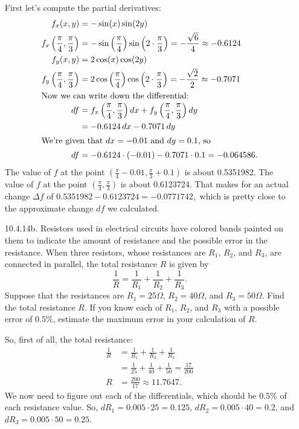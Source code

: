 \begin{enumerate}[leftmargin=0pt]
        \begin{red}
        First let's compute the partial derivatives:
        \begin{align*}
            f_x(x,y) &= -\sin(x)\sin(2y) \\
            f_x\left(\frac{\pi}{4}, \frac{\pi}{3}\right)
            &= -\sin\left(\frac{\pi}{4}\right) \sin\left(2\cdot\frac{\pi}{3}\right) = -\frac{\sqrt{6}}{4} \approx -0.6124 \\
            f_y(x,y) &= 2\cos(x)\cos(2y) \\
            f_y\left(\frac{\pi}{4}, \frac{\pi}{3}\right)
            &=2\cos\left(\frac{\pi}{4}\right)\cos\left(2\cdot\frac{\pi}{3}\right) = -\frac{\sqrt{2}}{2} \approx -0.7071 \\
            \intertext{Now we can write down the differential:}
            df &= f_x\left(\frac{\pi}{4}, \frac{\pi}{3}\right) dx + f_y\left(\frac{\pi}{4}, \frac{\pi}{3}\right) dy \\
            &= -0.6124\, dx - 0.7071\, dy \\
            \intertext{We're given that $dx=-0.01$ and $dy=0.1$, so}
            df &= -0.6124\cdot(-0.01) - 0.7071\cdot 0.1 = -0.064586.
        \end{align*}
        The value of $f$ at the point $\left(\tfrac{\pi}{4}-0.01, \tfrac{\pi}{3}+0.1\right)$ is about 0.5351982. The value of $f$ at the point $\left(\tfrac{\pi}{4}, \tfrac{\pi}{3}\right)$ is about 0.6123724. That makes for an actual change $\Delta f$ of $ 0.5351982 - 0.6123724 = -0.0771742,$ which is pretty close to the approximate change $df$ we calculated.
        \end{red}
        
\item[10.4.14b.] Resistors used in electrical circuits have colored bands painted on them to indicate the amount of resistance and the possible error in the resistance. When three resistors, whose resistances are $R_1$, $R_2$, and $R_3$, are connected in parallel, the total resistance $R$ is given by \[\frac1R = \frac1{R_1} + \frac1{R_2} + \frac1{R_3}.\]
Suppose that the resistances are $R_1 = 25\Omega$, $R_2 = 40\Omega$, and $R_3 = 50\Omega$. Find the total resistance $R$. If you know each of $R_1$, $R_2$, and $R_3$ with a possible error of $0.5\%$, estimate the maximum error in your calculation of $R$.
        
        \begin{red}
        So, first of all, the total resistance:
        \begin{align*}
            \frac1R &= \frac1{R_1} + \frac1{R_2} + \frac1{R_3} \\
            &= \frac{1}{25} + \frac{1}{40} + \frac{1}{50} = \frac{17}{200} \\
            R &= \frac{200}{17} \approx 11.7647.
        \end{align*}
        We now need to figure out each of the differentials, which should be $0.5\%$ of each resistance value. So, $dR_1 = 0.005\cdot 25 = 0.125$, $dR_2 = 0.005\cdot 40 = 0.2$, and $dR_3 = 0.005\cdot 50 = 0.25$.
        

\end{red}
\end{enumerate}
